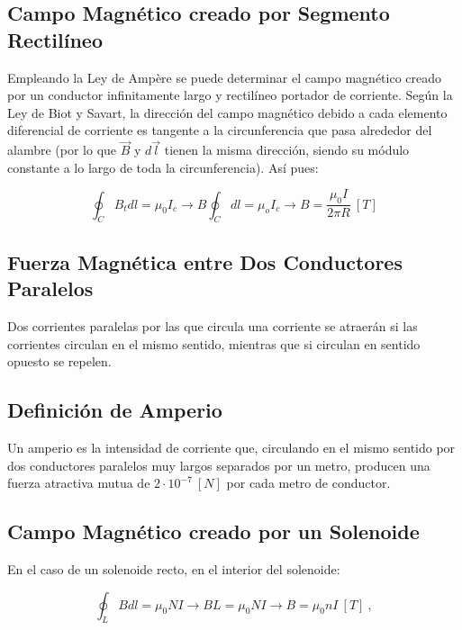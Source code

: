 \documentclass{tufte-handout}
\begin{document}
\subsection{Campo Magnético creado por Segmento Rectilíneo}

Empleando la Ley de Ampère se puede determinar el campo magnético creado por un conductor infinitamente largo y rectilíneo portador de corriente. Según la Ley de Biot y Savart, la dirección del campo magnético debido a cada elemento diferencial de corriente es tangente a la circunferencia que pasa alrededor del alambre (por lo que $\vec{B}$ y $d\vec{l}$ tienen la misma dirección, siendo su módulo constante a lo largo de toda la circunferencia). Así pues:

\begin{equation}
\oint_C B_t dl = \mu_0 I_c \rightarrow B \oint_C dl = \mu_o I_c \rightarrow B = \frac{\mu_0 I}{2\pi R}~[T]
\end{equation}

\subsection{Fuerza Magnética entre Dos Conductores Paralelos}

Dos corrientes paralelas por las que circula una corriente se atraerán si las corrientes circulan en el mismo sentido, mientras que si circulan en sentido opuesto se repelen.

\subsection{Definición de Amperio}

Un amperio es la intensidad de corriente que, circulando en el mismo sentido por dos conductores paralelos muy largos separados por un metro, producen una fuerza atractiva mutua de $2\cdot 10^{-7}~[N]$ por cada metro de conductor.

\subsection{Campo Magnético creado por un Solenoide}

En el caso de un solenoide recto, en el interior del solenoide:

\begin{equation}
\oint_L B dl = \mu_0 N I \rightarrow BL = \mu_0 N I \rightarrow B = \mu_0 n I~[T]~,
\end{equation}
\end{document}
